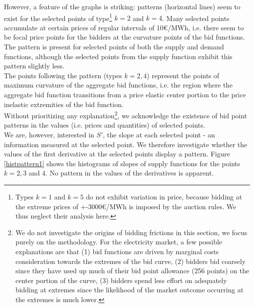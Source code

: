 However, a feature of the graphs is striking: patterns (horizontal lines) seem to exist for the selected points of type\footnote{Types $k=1$ and $k=5$ do not exhibit variation in price, because bidding at the extreme prices of  +-3000\euro{}/MWh is imposed by the auction rules. We thus neglect their analysis here.} $k=2$ and $k=4$. Many selected points accumulate at certain prices of regular intervals of 10\euro{}/MWh, i.e. there seem to be focal price points for the bidders at the curvature points of the bid functions. The pattern is present for selected points of both the supply and demand functions, although the selected points from the supply function exhibit this pattern slightly less. \\

The points following the pattern (types $k=2,4$) represent the points of maximum curvature of the aggregate bid functions, i.e. the region where the aggregate bid function transitions from a price elastic center portion to the price inelastic extremities of the bid function. \\

Without prioritizing any explanation\footnote{We do not investigate the origins of bidding frictions in this section, we focus purely on the methodology. For the electricity market, a few possible explanations are that (1) bid functions are driven by marginal costs consideration towards the extremes of the bid curve, (2) bidders bid coarsely since they have used up much of their bid point allowance (256 points) on the center portion of the curve, (3) bidders spend less effort on adequately bidding at extremes since the likelihood of the market outcome occurring at the extremes is much lower. }, we acknowledge the existence of bid point patterns in the values (i.e. prices and quantities) of selected points. \\

We are, however, interested in $S'$, the slope at each selected point - an information measured at the selected point. We therefore investigate whether the values of the first derivative at the selected points display a pattern. Figure \ref{histpattern1} shows the histograms of slopes of supply functions for the points $k=2,3$ and 4. No pattern in the values of the derivatives is apparent. \\

